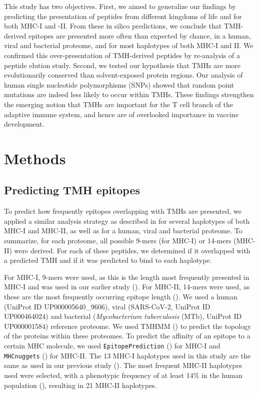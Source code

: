 This study has two objectives. First, we aimed to generalize our findings by predicting the presentation of peptides from different kingdoms of life and for both MHC-I and -II. From these in silico predictions, we conclude that TMH-derived
epitopes are presented more often than expected by chance,
in a human, viral and bacterial proteome, and for most haplotypes of both MHC-I and II. We confirmed this over-presentation of TMH-derived peptides by re-analysis of a peptide elution study. Second, we tested our hypothesis that TMHs
are more evolutionarily conserved than  solvent-exposed protein regions. Our analysis of human
single nucleotide polymorphisms (SNPs) showed that random point mutations are indeed less likely
to occur within TMHs. These findings strengthen the emerging notion that TMHs are important for the T cell branch of the adaptive immune system, and hence are of  
overlooked importance in vaccine development.

\section{Methods}

\subsection{Predicting TMH epitopes}

To predict how frequently epitopes overlapping with TMHs are presented,
we applied a similar analysis strategy as described in \cite{bianchi2017} for several haplotypes of both MHC-I and MHC-II, 
as well as for a human, viral and bacterial proteome.
To summarize, for each proteome, 
all possible 9-mers (for MHC-I) or 14-mers (MHC-II) were derived. 
For each of these peptides, we determined if it overlapped with a predicted 
TMH and if it was predicted to bind to each haplotype.

For MHC-I, 9-mers were used, as this is the length most frequently presented in MHC-I and was used in our earlier
study (\cite{bianchi2017}). For MHC-II, 14-mers were used,  as these are the most frequently occurring
epitope length (\cite{bergseng2015different}).
We used a human (UniProt ID UP000005640\_9606), 
viral (SARS-CoV-2, UniProt ID UP000464024) 
and bacterial (\emph{Mycobacterium tuberculosis} (MTb), UniProt ID UP000001584) 
reference proteome. We used TMHMM (\cite{krogh2001predicting}) to predict the topology 
of the proteins within these proteomes.
To predict the affinity of an epitope to a certain MHC molecule,
we used \verb;EpitopePrediction; (\cite{bianchi2017}) for MHC-I 
and \verb;MHCnuggets; (\cite{shao2020high}) for MHC-II.
The 13 MHC-I haplotypes used in this study are the same as 
used in our previous study (\cite{bianchi2017}).
The most frequent MHC-II haplotypes used  were selected, with a phenotypic frequency of at least 14\% in
the human population (\cite{greenbaum2011functional}),
resulting in 21 MHC-II haplotypes.

